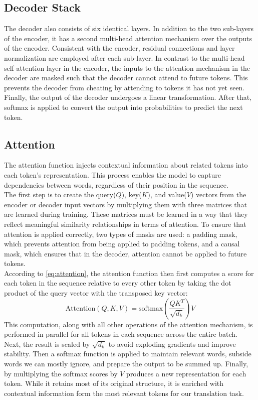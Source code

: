\subsection{Decoder Stack} 
The decoder also consists of six identical layers.
In addition to the two sub-layers of the encoder, it has a second multi-head attention mechanism over the outputs of the encoder.
Consistent with the encoder, residual connections and layer normalization are employed after each sub-layer.
In contrast to the multi-head self-attention layer in the encoder, the inputs to the attention mechanism in the decoder are masked such that the decoder cannot attend to future tokens.
This prevents the decoder from cheating by attending to tokens it has not yet seen.
Finally, the output of the decoder undergoes a linear transformation. After that, softmax is applied to convert the output into probabilities to predict the next token.

\subsection{Attention}\label{sec:attention}
The attention function injects contextual information about related tokens into each token's representation.
This process enables the model to capture dependencies between words, regardless of their position in the sequence. \\
The first step is to create the query(\(Q)\), key(\(K)\), and value(\(V)\) vectors from the encoder or decoder input vectors by multiplying them with three matrices that are learned during training.
These matrices must be learned in a way that they reflect meaningful similarity relationships in terms of attention.
To ensure that attention is applied correctly, two types of masks are used: a padding mask, which prevents attention from being applied to padding tokens, and a causal mask, which ensures that in the decoder, attention cannot be applied to future tokens.\\
According to \cref{eq:attention}, the attention function then first computes a score for each token in the sequence relative to every other token by taking the dot product of the query vector with the transposed key vector:
\begin{equation}
    \text{Attention}(Q,K,V) = \text{softmax}\left(\frac{QK^T}{\sqrt{d_k}}\right)V
    \label{eq:attention}
\end{equation}
This computation, along with all other operations of the attention mechanism, is performed in parallel for all tokens in each sequence across the entire batch.
Next, the result is scaled by \(\sqrt{d_k}\) to avoid exploding gradients and improve stability.
Then a softmax function is applied to maintain relevant words, subside words we can mostly ignore, and prepare the output to be summed up.
Finally, by multiplying the softmax scores by \(V\) produces a new representation for each token.
While it retains most of its original structure, it is enriched with contextual information form the most relevant tokens for our translation task. \\

